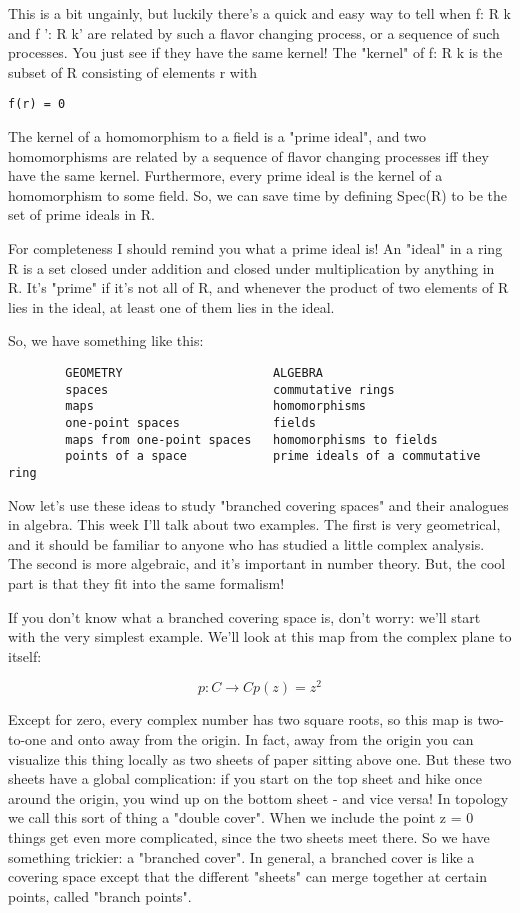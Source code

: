 This is a bit ungainly, but luckily there's a quick and easy way to tell 
when f: R \to  k and f ': R \to  k' are related by such a flavor changing 
process, or a sequence of such processes.  You just see if they have
the same kernel!  The "kernel" of f: R \to  k is the subset of R 
consisting of elements r with 

\begin{verbatim}
f(r) = 0
\end{verbatim}
    
The kernel of a homomorphism to a field is a "prime ideal", and two
homomorphisms are related by a sequence of flavor changing processes
iff they have the same kernel.  Furthermore, every prime ideal is
the kernel of a homomorphism to some field.  So, we can save time by
defining Spec(R) to be the set of prime ideals in R.  

For completeness I should remind you what a prime ideal is!  An 
"ideal" 
in a ring R is a set closed under addition and closed under multiplication 
by anything in R.  It's "prime" if it's not all of R, and whenever 
the product of two elements of R lies in the ideal, at least one of them 
lies in the ideal.  

So, we have something like this:

\begin{verbatim}
        GEOMETRY                     ALGEBRA
        spaces                       commutative rings
        maps                         homomorphisms
        one-point spaces             fields
        maps from one-point spaces   homomorphisms to fields
        points of a space            prime ideals of a commutative ring
\end{verbatim}
    
Now let's use these ideas to study "branched covering spaces" and 
their analogues in algebra.  This week I'll talk about two examples.  The first
is very geometrical, and it should be familiar to anyone who has studied 
a little complex analysis.   The second is more algebraic, and it's 
important in number theory.  But, the cool part is that they fit into 
the same formalism!

If you don't know what a branched covering space is, don't worry:
we'll start with the very simplest example.  We'll look at this map from 
the complex plane to itself:

$$
p: C \to  C

p(z) = z^{2}
$$
    
Except for zero, every complex number has two square roots, so this map 
is two-to-one and onto away from the origin.  In fact, away from the 
origin you can visualize this thing locally as two sheets of paper 
sitting above one.  But these two sheets have a global complication: if 
you start on the top sheet and hike once around the origin, you wind up 
on the bottom sheet - and vice versa!  In topology we call this sort of 
thing a "double cover".  When we include the point z = 0 things get 
even more complicated, since the two sheets meet there.  So we have 
something trickier: a "branched cover". In general, a branched cover 
is like a covering space except that the different "sheets" can merge
together at certain points, called "branch points". 

